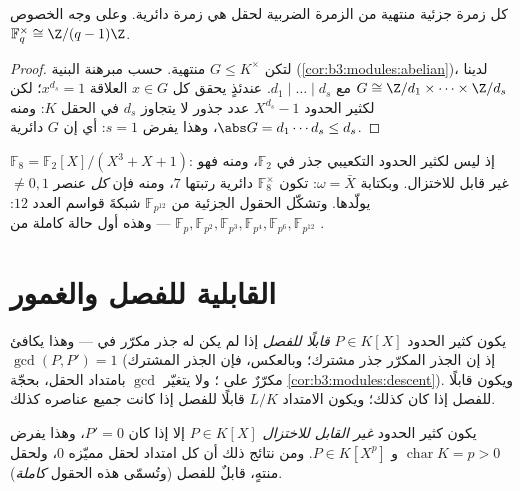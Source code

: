 \begin{theorem}[الدائرية]\label{thm:b3:galois:cyclic}
كل زمرة جزئية منتهية من الزمرة الضربية لحقل هي زمرة دائرية. وعلى
وجه الخصوص $\mathbb F_q^\times \cong
\Z/(q-1)\Z$.
\end{theorem}

\begin{proof}
لتكن $G \leq K^\times$ منتهية. حسب مبرهنة البنية (\cref{cor:b3:modules:abelian})، لدينا
$G \cong \Z/d_1 \times \dots
\times \Z/d_s$ مع $d_1 \mid \dots \mid d_s$. عندئذٍ يحقق كل $x \in G$ العلاقة
$x^{d_s} = 1$؛ لكن لكثير الحدود $X^{d_s} - 1$ عدد جذور لا يتجاوز
$d_s$ في الحقل $K$: ومنه $\abs G = d_1\cdots d_s \leq d_s$، وهذا يفرض $s = 1$: أي إن $G$
دائرية.
\end{proof}

\begin{example}\label{ex:b3:galois:f8}
$\mathbb F_8 = \mathbb F_2[X]/(X^3 + X + 1)$: إذ ليس لكثير الحدود التكعيبي جذر في $\mathbb F_2$، ومنه
فهو غير قابل للاختزال. وبكتابة $\omega =
\bar X$: تكون $\mathbb F_8^\times$ دائرية
رتبتها $7$، ومنه فإن \emph{كل} عنصر $\neq 0, 1$ يولّدها. وتشكّل
الحقول الجزئية من $\mathbb F_{p^{12}}$ شبكةَ قواسم العدد $12$: $\mathbb F_p, \mathbb F_{p^2}, \mathbb F_{p^3}, \mathbb F_{p^4},
\mathbb F_{p^6}, \mathbb F_{p^{12}}$ ---
وهذه أول حالة كاملة من .
\end{example}

\section{القابلية للفصل والغمور}

\begin{definition}\label{def:b3:galois:separable}
يكون كثير الحدود $P \in K[X]$ \emph{قابلًا للفصل} إذا لم يكن له جذر مكرّر في  --- وهذا يكافئ
$\gcd(P, P') = 1$ (إذ إن الجذر المكرّر جذر مشترك؛ وبالعكس، فإن الجذر
المشترك مكرّرٌ على ؛ ولا يتغيّر $\gcd$
بامتداد الحقل، بحجّة \cref{cor:b3:modules:descent}). ويكون  قابلًا للفصل
إذا كان  كذلك؛ ويكون الامتداد $L/K$ قابلًا
للفصل إذا كانت جميع عناصره كذلك.
\end{definition}

\begin{proposition}\label{prop:b3:galois:perfect}
يكون كثير الحدود \emph{غير القابل للاختزال} $P \in K[X]$  إلا إذا كان $P' = 0$، وهذا يفرض $\operatorname{char} K = p > 0$ و $P \in K[X^p]$.
ومن نتائج ذلك أن كل امتداد  لحقل مميّزه $0$، ولحقل منتهٍ،
قابلٌ للفصل (وتُسمّى هذه الحقول \emph{كاملة}).
\end{proposition}

